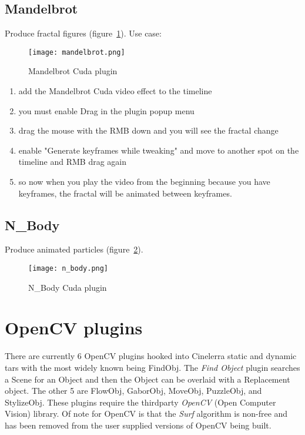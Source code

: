 \subsection{Mandelbrot}%
\label{sub:mandelbrot}

Produce fractal figures (figure~\ref{fig:mandelbrot}). Use case:

\begin{figure}[hbtp]
	\centering
	\texttt{[image: mandelbrot.png]}
	\caption{Mandelbrot Cuda plugin}
	\label{fig:mandelbrot}
\end{figure}

\begin{enumerate}
	\item add the Mandelbrot Cuda video effect to the timeline
	\item you must enable Drag in the plugin popup menu
	\item drag the mouse with the RMB down and you will see the fractal change
	\item enable "Generate keyframes while tweaking" and move to another spot on the timeline and RMB drag again
	\item so now when you play the video from the beginning because you have keyframes, the fractal will be animated between keyframes.
\end{enumerate}

\subsection{N\_Body}%
\label{sub:n_body}

Produce animated particles (figure~\ref{fig:n_body}).

\begin{figure}[hbtp]
	\centering
	\texttt{[image: n\_body.png]}
	\caption{N\_Body Cuda plugin}
	\label{fig:n_body}
\end{figure}

\section{OpenCV plugins}%
\label{sec:opencv_plugins}

There are currently 6 OpenCV plugins hooked into Cinelerra static and dynamic tars with the most
widely known being FindObj.  The \textit{Find Object} plugin searches a Scene for an Object and
then the Object can be overlaid with a Replacement object. The other 5 are FlowObj, GaborObj,
MoveObj, PuzzleObj, and StylizeObj. These  plugins require the thirdparty \textit{OpenCV}
(Open Computer Vision) library.  Of note for OpenCV is that the \textit{Surf} algorithm is non-free
and has been removed from the user supplied versions of OpenCV being built.

